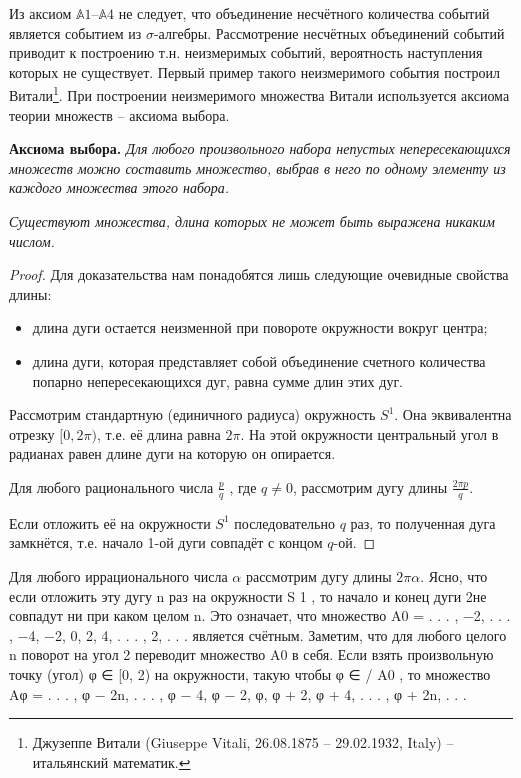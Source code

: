 \begin{zam}
Из аксиом $\mathbb{A}1$--$\mathbb{A}4$ не следует, что объединение несчётного количества событий является событием из $\sigma$-алгебры. Рассмотрение несчётных объединений событий приводит к построению т.н. неизмеримых событий, вероятность наступления которых не существует. Первый пример
такого неизмеримого события построил Витали\footnote{Джузеппе Витали (Giuseppe Vitali, 26.08.1875 -- 29.02.1932, Italy) -- итальянский математик.}. При построении неизмеримого множества Витали используется аксиома теории множеств -- аксиома
выбора.
\end{zam}

\textbf{Аксиома выбора.} \textit{Для любого произвольного набора непустых непересекающихся множеств можно составить множество, выбрав в него по одному элементу из каждого множества этого набора.}

\begin{theorem}
\textit{Существуют множества, длина которых не может быть выражена никаким числом.}
\end{theorem}
\begin{proof}
Для доказательства нам понадобятся лишь следующие очевидные свойства длины:
\begin{itemize}
\item длина дуги остается неизменной при повороте окружности вокруг
центра;
\item длина дуги, которая представляет собой объединение счетного количества попарно непересекающихся дуг, равна сумме длин этих
дуг.	
\end{itemize}	

Рассмотрим стандартную (единичного радиуса) окружность $S^1$. Она эквивалентна отрезку $[0, 2\pi)$, т.е. её длина равна $2\pi$. На этой окружности центральный угол в радианах равен длине дуги на которую он опирается.

Для любого рационального числа $\frac{p}{q}$ , где $q\ne 0$, рассмотрим дугу длины $\frac{2\pi p}{q}$.

Если отложить её на окружности $S^1$ последовательно $q$ раз, то полученная дуга замкнётся, т.е. начало 1-ой дуги совпадёт с концом $q$-ой.
\end{proof}

Для любого иррационального числа $\alpha$ рассмотрим дугу длины $2\pi\alpha$. Ясно,
что если отложить эту дугу n раз на окружности S 1 , то начало и конец
дуги 2 не совпадут ни при каком целом n. Это означает, что множество
A0 = {. . . , −2, . . . , −4, −2, 0, 2, 4, . . . , 2, . . . }
является счётным. Заметим, что для любого целого n поворот на угол 2
переводит множество A0 в себя.
Если взять произвольную точку (угол) φ ∈ [0, 2\pi) на окружности, такую
чтобы φ ∈
/ A0 , то множество
Aφ = {. . . , φ − 2 n, . . . , φ − 4, φ − 2, φ, φ + 2, φ + 4, . . . , φ + 2 n, . . . }

